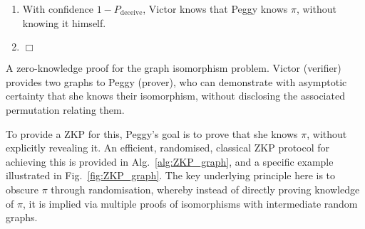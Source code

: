\begin{table}[!htbp]
\begin{mdframed}[innertopmargin=3pt, innerbottommargin=3pt, nobreak]
{\begin{enumerate}
\begin{align}
		P_\text{deceive} = \frac{1}{2^n}	.
	\end{align}
	\item With confidence \mbox{$1-P_\text{deceive}$}, Victor knows that Peggy knows $\pi$, without knowing it himself.
	\item $\Box$
\end{enumerate}}
\end{mdframed}
\captionspacealg \caption{A zero-knowledge proof for the graph isomorphism problem. Victor (verifier) provides two graphs to Peggy (prover), who can demonstrate with asymptotic certainty that she knows their isomorphism, without disclosing the associated permutation relating them.} \label{alg:ZKP_graph}
\end{table}

To provide a ZKP for this, Peggy's goal is to prove that she knows $\pi$, without explicitly revealing it. An efficient, randomised, classical ZKP protocol for achieving this is provided in Alg.~\ref{alg:ZKP_graph}, and a specific example illustrated in Fig.~\ref{fig:ZKP_graph}. The key underlying principle here is to obscure $\pi$ through randomisation, whereby instead of directly proving knowledge of $\pi$, it is implied via multiple proofs of isomorphisms with intermediate random graphs.